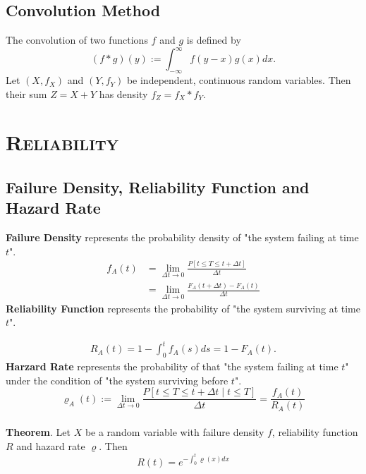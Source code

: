 \documentclass[a4paper,12pt]{article}
\begin{document}
    \subsection{Convolution Method}
    The convolution of two functions $f$ and $g$ is defined by
\begin{equation}
(f * g)(y):=\int_{-\infty}^{\infty} f(y-x) g(x) d x .
\end{equation}
Let $\left(X, f_X\right)$ and $\left(Y, f_Y\right)$ be independent, continuous random variables. Then their sum $Z=X+Y$ has density $f_Z=f_X * f_Y$.






    \section{\textsc{Reliability}}
    \subsection{Failure Density, Reliability Function and Hazard Rate}
    \textbf{Failure Density} represents the probability density of "the system failing at time $t$".
    \begin{equation}
        \begin{aligned}
        f_A(t) & =\lim _{\Delta t \rightarrow 0} \frac{P[t \leq T \leq t+\Delta t]}{\Delta t} \\
        & =\lim _{\Delta t \rightarrow 0} \frac{F_A(t+\Delta t)-F_A(t)}{\Delta t}
        \end{aligned}
        \end{equation}
    \textbf{Reliability Function} represents the probability of "the system surviving at time $t$".

    \begin{equation}
        \begin{aligned}
        R_A(t) =1-\int_0^t f_A(s) d s =1-F_A(t) .
        \end{aligned}
        \end{equation}
    \textbf{Harzard Rate} represents the probability of that "the system failing at time $t$" under the condition of "the system surviving before $t$".
    \begin{equation}
        \varrho_A(t):=\lim _{\Delta t \rightarrow 0} \frac{P[t \leq T \leq t+\Delta t \mid t \leq T]}{\Delta t} = \dfrac{f_A(t)}{R_A(t)}
        \end{equation} 
    ~\\
    \noindent \textbf{Theorem}. Let $X$ be a random variable with failure density $f$, reliability function $R$ and hazard rate $\varrho$. Then
    \begin{equation}
        R(t)=e^{-\int_0^t \varrho(x) d x}
    \end{equation}
\end{document}
